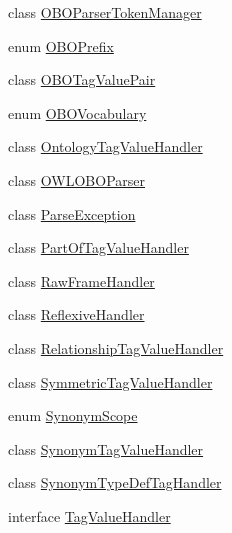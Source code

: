 \begin{DoxyCompactItemize}
\item 
class \hyperlink{classorg_1_1coode_1_1owlapi_1_1obo_1_1parser_1_1_o_b_o_parser_token_manager}{O\-B\-O\-Parser\-Token\-Manager}
\item 
enum \hyperlink{enumorg_1_1coode_1_1owlapi_1_1obo_1_1parser_1_1_o_b_o_prefix}{O\-B\-O\-Prefix}
\item 
class \hyperlink{classorg_1_1coode_1_1owlapi_1_1obo_1_1parser_1_1_o_b_o_tag_value_pair}{O\-B\-O\-Tag\-Value\-Pair}
\item 
enum \hyperlink{enumorg_1_1coode_1_1owlapi_1_1obo_1_1parser_1_1_o_b_o_vocabulary}{O\-B\-O\-Vocabulary}
\item 
class \hyperlink{classorg_1_1coode_1_1owlapi_1_1obo_1_1parser_1_1_ontology_tag_value_handler}{Ontology\-Tag\-Value\-Handler}
\item 
class \hyperlink{classorg_1_1coode_1_1owlapi_1_1obo_1_1parser_1_1_o_w_l_o_b_o_parser}{O\-W\-L\-O\-B\-O\-Parser}
\item 
class \hyperlink{classorg_1_1coode_1_1owlapi_1_1obo_1_1parser_1_1_parse_exception}{Parse\-Exception}
\item 
class \hyperlink{classorg_1_1coode_1_1owlapi_1_1obo_1_1parser_1_1_part_of_tag_value_handler}{Part\-Of\-Tag\-Value\-Handler}
\item 
class \hyperlink{classorg_1_1coode_1_1owlapi_1_1obo_1_1parser_1_1_raw_frame_handler}{Raw\-Frame\-Handler}
\item 
class \hyperlink{classorg_1_1coode_1_1owlapi_1_1obo_1_1parser_1_1_reflexive_handler}{Reflexive\-Handler}
\item 
class \hyperlink{classorg_1_1coode_1_1owlapi_1_1obo_1_1parser_1_1_relationship_tag_value_handler}{Relationship\-Tag\-Value\-Handler}
\item 
class \hyperlink{classorg_1_1coode_1_1owlapi_1_1obo_1_1parser_1_1_symmetric_tag_value_handler}{Symmetric\-Tag\-Value\-Handler}
\item 
enum \hyperlink{enumorg_1_1coode_1_1owlapi_1_1obo_1_1parser_1_1_synonym_scope}{Synonym\-Scope}
\item 
class \hyperlink{classorg_1_1coode_1_1owlapi_1_1obo_1_1parser_1_1_synonym_tag_value_handler}{Synonym\-Tag\-Value\-Handler}
\item 
class \hyperlink{classorg_1_1coode_1_1owlapi_1_1obo_1_1parser_1_1_synonym_type_def_tag_handler}{Synonym\-Type\-Def\-Tag\-Handler}
\item 
interface \hyperlink{interfaceorg_1_1coode_1_1owlapi_1_1obo_1_1parser_1_1_tag_value_handler}{Tag\-Value\-Handler}
\item 

\end{DoxyCompactItemize}

